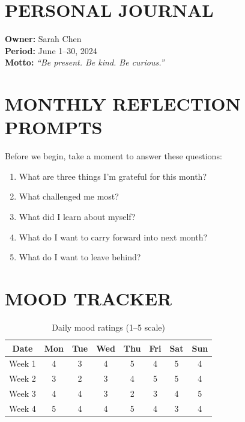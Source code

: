 \documentclass[
    language=english,
    doctype=journal,
    institution=none,
]{../../omnilatex}
\begin{document}
\maketitle

\section*{PERSONAL JOURNAL}

\textbf{Owner:} Sarah Chen\\
\textbf{Period:} June 1--30, 2024\\
\textbf{Motto:} \textit{``Be present. Be kind. Be curious.''}

\section*{MONTHLY REFLECTION PROMPTS}

Before we begin, take a moment to answer these questions:
\begin{enumerate}
    \item What are three things I'm grateful for this month?
    \item What challenged me most?
    \item What did I learn about myself?
    \item What do I want to carry forward into next month?
    \item What do I want to leave behind?
\end{enumerate}

\section*{MOOD TRACKER}

\begin{table}[h]
\centering
\small
\begin{tabular}{c|c|c|c|c|c|c|c}
\textbf{Date} & \textbf{Mon} & \textbf{Tue} & \textbf{Wed} & \textbf{Thu} & \textbf{Fri} & \textbf{Sat} & \textbf{Sun} \\
\hline
Week 1 & 4 & 3 & 4 & 5 & 4 & 5 & 4 \\
Week 2 & 3 & 2 & 3 & 4 & 5 & 5 & 4 \\
Week 3 & 4 & 4 & 3 & 2 & 3 & 4 & 5 \\
Week 4 & 5 & 4 & 4 & 5 & 4 & 3 & 4 \\
\end{tabular}
\caption{Daily mood ratings (1--5 scale)}
\end{table}
\end{document}
